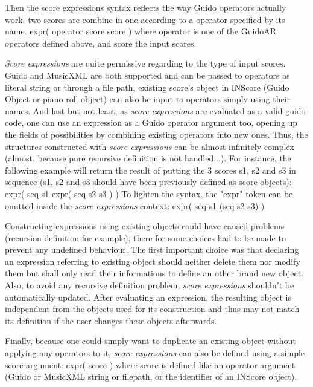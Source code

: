 \documentclass{article}
\newenvironment{INScode}		{\vspace{-2mm}\small\verbatim}{\endverbatim\vspace{-2mm}}
\newcommand{\sExpr}{\emph{score expressions} }
\newcommand{\SExpr}{\emph{Score expressions} }
\begin{document}
Then the score expressions syntax reflects the way Guido operators actually work: two scores are combine in one according to a operator specified by its name.
\begin{INScode}
expr( operator score score )
\end{INScode}
where operator is one of the GuidoAR operators defined above, and score the input scores. 

\SExpr are quite permissive regarding to the type of input scores. Guido and MusicXML are both supported and can be passed to operators as literal string or through a file path, existing score's object in INScore (Guido Object or piano roll object) can also be input to operators simply using their names. And last but not least, as \sExpr are evaluated as a valid guido code, one can use an expression as a Guido operator argument too, opening up the fields of possibilities by combining existing operators into new ones. Thus, the structures constructed with \sExpr can be almost infinitely complex (almost, because pure recursive definition is not handled...). For instance, the following example will return the result of putting the 3 scores s1, s2 and s3 in sequence (s1, s2 and s3 should have been previously defined as score objects):
\begin{INScode}
expr( seq s1 expr( seq s2 s3 ) )
\end{INScode}
To lighten the syntax, the "expr" token can be omitted inside the \sExpr context:
\begin{INScode}
expr( seq s1 (seq s2 s3) )
\end{INScode}

Constructing expressions using existing objects could have caused problems (recursion definition for example), there for some choices had to be made to prevent any undefined behaviour. The first important choice was that declaring an expression referring to existing object should neither delete them nor modify them but shall only read their informations to define an other brand new object. Also, to avoid any recursive definition problem, \sExpr shouldn't be automatically updated. After evaluating an expression, the resulting object is independent from the objects used for its construction and thus may not match its definition if the user changes these objects afterwards.

\smallbreak
Finally, because one could simply want to duplicate an existing object without applying any operators to it, \sExpr can also be defined using a simple score argument:
\begin{INScode}
expr( score )
\end{INScode}
where score is defined like an operator argument (Guido or MusicXML string or filepath, or the identifier of an INScore object).
\end{document}
